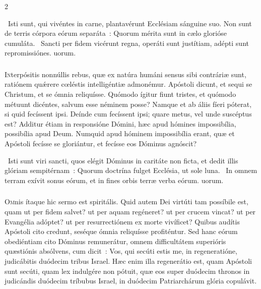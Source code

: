 \documentclass[9pt,twoside]{extarticle}
\begin{document}
\begin{multicols}{2}
{\begin{tightlist}{}
\item {}~Isti sunt, qui vivéntes in carne, plantavérunt Ecclésiam sánguine suo. Non sunt de terris córpora eórum separáta~: \textred{*} Quorum mérita sunt in cælo glorióse cumuláta. ~Sancti per fidem vicérunt regna, operáti sunt justítiam, adépti sunt repromissiónes. uorum.
\end{tightlist}

\subsubsection*{\center {}}
\lettrine{I}nterpósitis nonnúllis rebus, quæ ex natúra humáni sensus sibi contráriæ sunt, ratiónem quǽrere cœléstis intelligéntiæ admonémur. Apóstoli dicunt, et sequi se Christum, et se ómnia reliquísse. Quómodo ígitur fiunt tristes, et quómodo métuunt dicéntes, salvum esse néminem posse? Namque et ab áliis fíeri póterat, si quid fecíssent ipsi. Deínde cum fecíssent ipsi; quare metus, vel unde suscéptus est? Additur étiam in responsióne Dómini, hæc apud hómines impossibília, possibília apud Deum. Numquid apud hóminem impossibília erant, quæ et Apóstoli fecísse se gloriántur, et fecísse eos Dóminus agnóscit?

\begin{tightlist}{}
\item {}~Isti sunt viri sancti, quos elégit Dóminus in caritáte non ficta, et dedit illis glóriam sempitérnam~: \textred{*} Quorum doctrína fulget Ecclésia, ut sole luna. ~In omnem terram exívit sonus eórum, et in fines orbis terræ verba eórum. uorum.
\end{tightlist}

\subsubsection*{\center {}}
\lettrine{O}mnis ítaque hic sermo est spiritális. Quid autem Dei virtúti tam possíbile est, quam ut per fidem salvet? ut per aquam regéneret? ut per crucem vincat? ut per Evangélia adóptet? ut per resurrectiónem ex morte vivíficet? Quibus audítis Apóstoli cito credunt, seséque ómnia reliquísse profiténtur. Sed hanc eórum obediéntiam cito Dóminus remunerátur, omnem difficultátem superióris quæstiónis absólvens, cum dicit~: Vos, qui secúti estis me, in regeneratióne, judicábitis duódecim tribus Israel. Hæc enim illa regenerátio est, quam Apóstoli sunt secúti, quam lex indulgére non pótuit, quæ eos super duódecim thronos in judicándis duódecim tríbubus Israel, in duódecim Patriarchárum glória copulávit.

}
\end{multicols}
\end{document}
